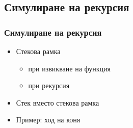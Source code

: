 \documentclass{beamer}
\begin{document}
\subsection{Симулиране на рекурсия}

\begin{frame}
  \frametitle{Симулиране на рекурсия}

  \begin{itemize}
  \item Стекова рамка
    \begin{itemize}
    \item при извикване на функция
    \item при рекурсия
    \end{itemize}
  \item Стек вместо стекова рамка
  \item Пример: ход на коня
  \end{itemize}
\end{frame}

\end{document}

